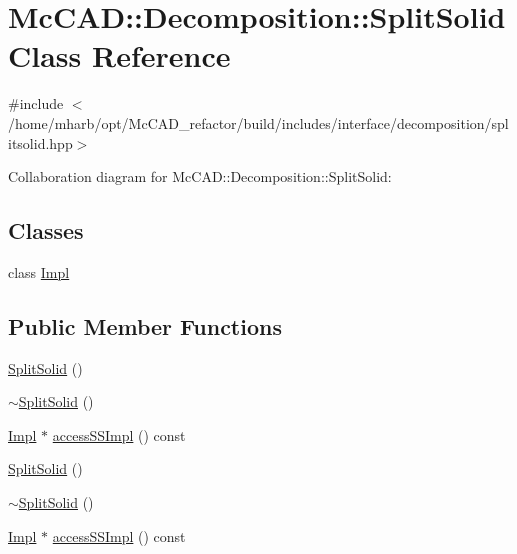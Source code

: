 \hypertarget{classMcCAD_1_1Decomposition_1_1SplitSolid}{}\section{Mc\+C\+AD\+:\+:Decomposition\+:\+:Split\+Solid Class Reference}
\label{classMcCAD_1_1Decomposition_1_1SplitSolid}


{\ttfamily \#include $<$/home/mharb/opt/\+Mc\+C\+A\+D\+\_\+refactor/build/includes/interface/decomposition/splitsolid.\+hpp$>$}



Collaboration diagram for Mc\+C\+AD\+:\+:Decomposition\+:\+:Split\+Solid\+:
\subsection*{Classes}
\begin{DoxyCompactItemize}
\item 
class \hyperlink{classMcCAD_1_1Decomposition_1_1SplitSolid_1_1Impl}{Impl}
\end{DoxyCompactItemize}
\subsection*{Public Member Functions}
\begin{DoxyCompactItemize}
\item 
\hyperlink{classMcCAD_1_1Decomposition_1_1SplitSolid_af0d38951f19a252ec24a48efa3d4a619}{Split\+Solid} ()
\item 
\hyperlink{classMcCAD_1_1Decomposition_1_1SplitSolid_a5f6fb2bf7319779b37c408759b1117ca}{$\sim$\+Split\+Solid} ()
\item 
\hyperlink{classMcCAD_1_1Decomposition_1_1SplitSolid_1_1Impl}{Impl} $\ast$ \hyperlink{classMcCAD_1_1Decomposition_1_1SplitSolid_a248b079e872fe66457b2f651c278cbd0}{access\+S\+S\+Impl} () const
\item 
\hyperlink{classMcCAD_1_1Decomposition_1_1SplitSolid_af0d38951f19a252ec24a48efa3d4a619}{Split\+Solid} ()
\item 
\hyperlink{classMcCAD_1_1Decomposition_1_1SplitSolid_a5f6fb2bf7319779b37c408759b1117ca}{$\sim$\+Split\+Solid} ()
\item 
\hyperlink{classMcCAD_1_1Decomposition_1_1SplitSolid_1_1Impl}{Impl} $\ast$ \hyperlink{classMcCAD_1_1Decomposition_1_1SplitSolid_a0fd0ec2ab42d1c18e2acf78c2526293e}{access\+S\+S\+Impl} () const
\end{DoxyCompactItemize}
